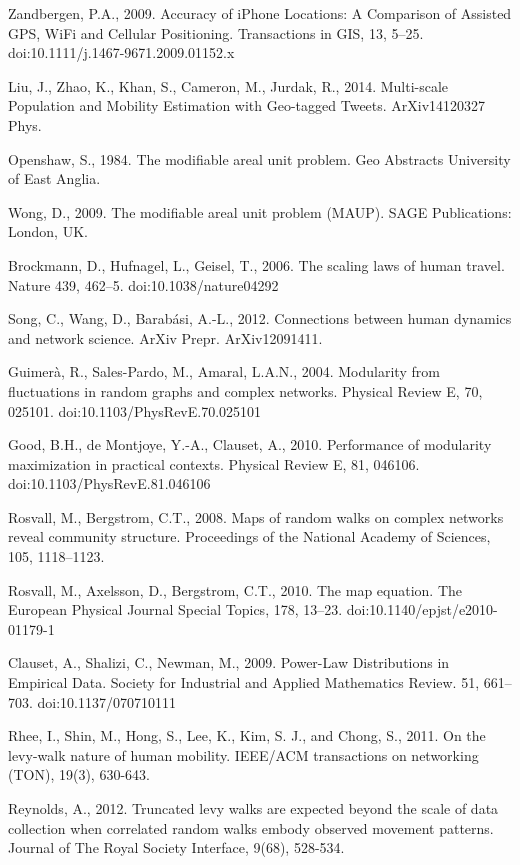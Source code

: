 \documentclass[10pt,letterpaper]{article}
\begin{document}
\begin{thebibliography}{10}
Zandbergen, P.A., 2009. Accuracy of iPhone Locations: A Comparison of Assisted GPS, WiFi and Cellular Positioning. Transactions in GIS, 13, 5–25. doi:10.1111/j.1467-9671.2009.01152.x

Liu, J., Zhao, K., Khan, S., Cameron, M., Jurdak, R., 2014. Multi-scale Population and Mobility Estimation with Geo-tagged Tweets. ArXiv14120327 Phys.

Openshaw, S., 1984. The modifiable areal unit problem. Geo Abstracts University of East Anglia.

Wong, D., 2009. The modifiable areal unit problem (MAUP). SAGE Publications: London, UK.

Brockmann, D., Hufnagel, L., Geisel, T., 2006. The scaling laws of human travel. Nature 439, 462–5. doi:10.1038/nature04292

Song, C., Wang, D., Barabási, A.-L., 2012. Connections between human dynamics and network science. ArXiv Prepr. ArXiv12091411.

Guimerà, R., Sales-Pardo, M., Amaral, L.A.N., 2004. Modularity from fluctuations in random graphs and complex networks. Physical Review E, 70, 025101. doi:10.1103/PhysRevE.70.025101

Good, B.H., de Montjoye, Y.-A., Clauset, A., 2010. Performance of modularity maximization in practical contexts. Physical Review E, 81, 046106. doi:10.1103/PhysRevE.81.046106

Rosvall, M., Bergstrom, C.T., 2008. Maps of random walks on complex networks reveal community structure. Proceedings of the National Academy of Sciences, 105, 1118–1123.

Rosvall, M., Axelsson, D., Bergstrom, C.T., 2010. The map equation. The European Physical Journal Special Topics, 178, 13–23. doi:10.1140/epjst/e2010-01179-1

Clauset, A., Shalizi, C., Newman, M., 2009. Power-Law Distributions in Empirical Data. Society for Industrial and Applied Mathematics Review. 51, 661–703. doi:10.1137/070710111


Rhee, I., Shin, M., Hong, S., Lee, K., Kim, S. J., and Chong, S., 2011. On the levy-walk nature of human mobility. IEEE/ACM transactions on networking (TON), 19(3), 630-643.

Reynolds, A., 2012. Truncated levy walks are expected beyond the scale of data collection when correlated random walks embody observed movement patterns. Journal of The Royal Society Interface, 9(68), 528-534.


\end{thebibliography}
\end{document}
